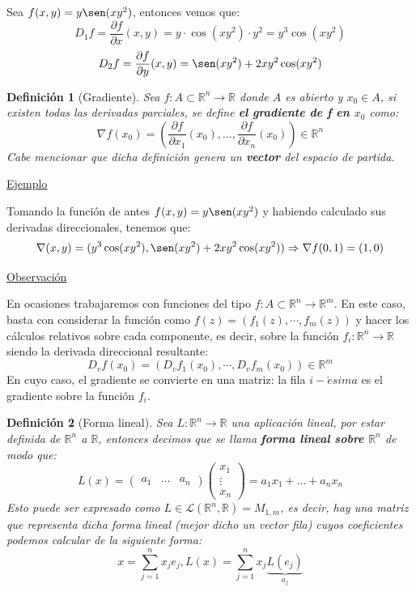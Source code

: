 \documentclass[10pt,a4paper,openright]{book}
\theoremstyle{break}
\newtheorem*{defi}{Definición}
\begin{document}
Sea $f(x,y) = y\sen(xy^{2})$, entonces vemos que:
$$D_1 f = \frac{\partial f}{\partial x} (x,y)= y \cdot \cos(xy^{2})\cdot y^{2} = y^{3}\cos(xy^{2})$$
$$D_2 f = \frac{\partial f}{\partial y} (x,y)= \sen(xy^{2}) +  2xy^{2}\cos(xy^{2})$$

\begin{defi}[Gradiente]
Sea $f: A \subset \mathbb{R}^n \to \mathbb{R}$ donde $A$ es abierto y $x_0 \in A$, si existen todas las derivadas parciales, se define \textbf{el gradiente de f en $x_0$} como:
$$\nabla f(x_0) = \left( \frac{\partial f}{\partial x_1} (x_0), \ldots, \frac{\partial f}{\partial x_n} (x_0) \right) \in  \mathbb{R}^n$$
Cabe mencionar que dicha definición genera un \textbf{vector} del espacio de partida.
\end{defi}

\underline{Ejemplo}

Tomando la función de antes $f(x,y) = y \sen(xy^2)$ y habiendo calculado sus derivadas direccionales, tenemos que:
$$\nabla(x,y) = (y^{3}\cos(xy^{2}), \sen(xy^{2}) +  2xy^{2}\cos(xy^{2})) \Rightarrow \nabla f(0,1) = (1,0)$$

\underline{Observación}

En ocasiones trabajaremos con funciones del tipo $f: A \subset \mathbb{R}^n \to \mathbb{R}^m$. En este caso, basta con considerar la función como $f(z) = (f_1(z), \cdots, f_m(z))$ y hacer los cálculos relativos sobre cada componente, es decir, sobre la función $f_i: \mathbb{R}^n \rightarrow \mathbb{R}$ siendo la derivada direccional resultante:
$$D_v f(x_0) = \left( D_v f_1(x_0), \cdots, D_v f_m(x_0)\right) \in \mathbb{R}^m$$
En cuyo caso, el gradiente se convierte en una matriz: la fila $i-\acute{e}sima$ es el gradiente sobre la función $f_i$.

\begin{defi}[Forma lineal]
Sea $L: \mathbb{R}^n \to \mathbb{R}$ una aplicación lineal, por estar definida de $\mathbb{R}^n$ a $\mathbb{R}$, entonces decimos que se llama \textbf{forma lineal sobre $\mathbb{R}^n$} de modo que:
$$L(x) = \begin{pmatrix}
a_1 & \ldots & a_n
\end{pmatrix} \begin{pmatrix}
x_1 \\ \vdots \\ x_n
\end{pmatrix}
 = a_1 x_1 + \ldots + a_n x_n$$
Esto puede ser expresado como $L \in \mathcal{L}(\mathbb{R}^n, \mathbb{R}) = M_{1,m}$, es decir, hay una matriz que representa dicha forma lineal (mejor dicho un vector fila) cuyos coeficientes podemos calcular de la siguiente forma:
$$x = \sum_{j=1}^{n} x_j e_j , L(x) = \sum_{j=1}^{n} x_j \underbrace{L(e_j)}_{a_j}$$
\end{defi}
\end{document}

